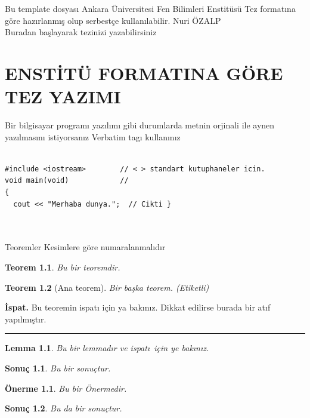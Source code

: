 \documentclass[12pt,a4paper,turkish]{book}
\newtheorem{theorem}{Teorem}[chapter]
\newtheorem{corollary}{Sonu\c{c}}[chapter]
\newtheorem{lemma}{Lemma}[chapter]
\newtheorem{proposition}{\"{O}nerme}[chapter]
\newenvironment{proof}[1][\.{I}spat]{\noindent \textbf{#1.} }{\  \rule{0.5em}{0.5em}}
\begin{document}
\noindent Bu  template dosyası Ankara Üniversitesi Fen Bilimleri Enstitüsü Tez formatına göre hazırlanmış olup serbestçe kullanılabilir. Nuri ÖZALP \\

Buradan başlayarak tezinizi yazabilirsiniz





\chapter{ENST\.{I}T\"{U} FORMATINA G\"{O}RE TEZ YAZIMI}



\bigskip

Bir bilgisayar programı yazılımı gibi durumlarda metnin orjinali
ile aynen yazılmasını istiyorsanız \textrm{Verbatim} tagı
kullanınız
\begin{verbatim}
 
#include <iostream>        // < > standart kutuphaneler icin.
void main(void)            // 
{
  cout << "Merhaba dunya.";  // Cikti }
 
 
\end{verbatim}


Teoremler Kesimlere göre numaralanmalıdır

\begin{theorem}
Bu bir teoremdir.
\end{theorem}

\begin{theorem}[Ana teorem]
Bir başka teorem. (Etiketli)
\end{theorem}

\begin{proof}
Bu teoremin ispatı için \cite{ozalp} ya bakınız. Dikkat edilirse
burada bir atıf yapılmıştır. 
\end{proof}

\begin{lemma}
Bu bir lemmad\i r ve ispat\i \ i\c{c}in \cite{ozalp2} ye bak\i n\i z.
\end{lemma}

\begin{corollary}
Bu bir sonuçtur.
\end{corollary}

\begin{proposition}
Bu bir Önermedir.
\end{proposition}

\begin{corollary}
Bu da bir sonuçtur.
\end{corollary}
\end{document}
